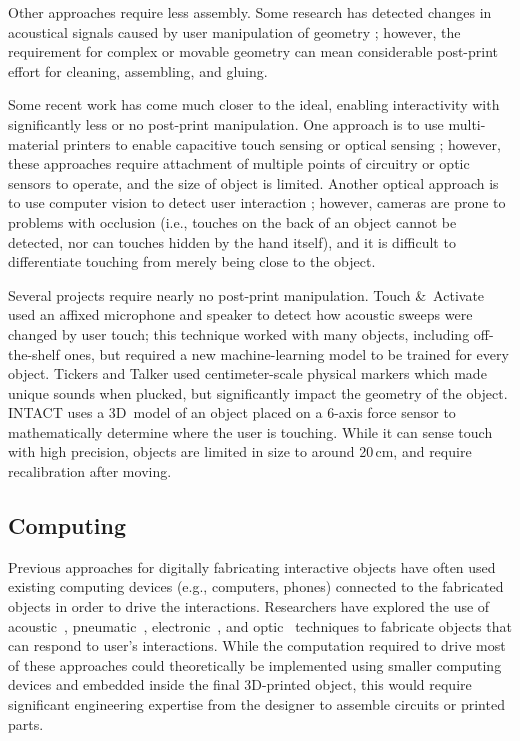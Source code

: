       Other approaches require less assembly. Some research has detected changes
      in acoustical signals caused by user manipulation of geometry
      \cite{Savage:2015, Laput:2015, Li:2016}; however, the requirement for
      complex or movable geometry can mean considerable post-print effort for
      cleaning, assembling, and gluing.

      Some recent work has come much closer to the \pap ideal, enabling
      interactivity with significantly less or no post-print manipulation. One
      approach is to use multi-material printers to enable capacitive touch
      sensing \cite{Schmitz:2015, Schmitz:2019, Gotzelmann:2016} or optical
      sensing \cite{Willis:2012}; however, these approaches require attachment
      of multiple points of circuitry or optic sensors to operate, and the size
      of object is limited. Another optical approach is to use computer vision
      to detect user interaction \cite{Shi:2016a}; however, cameras are prone to
      problems with occlusion (i.e., touches on the back of an object cannot be
      detected, nor can touches hidden by the hand itself), and it is difficult
      to differentiate touching from merely being close to the object.

      Several projects require nearly no post-print manipulation.
      Touch \&~Activate \cite{Ono:2013} used an affixed microphone and speaker
      to detect how acoustic sweeps were changed by user touch; this technique
      worked with many objects, including off-the-shelf ones, but required a new
      machine-learning model to be trained for every object.  Tickers and Talker
      \cite{Shi:2016} used centimeter-scale physical markers which made unique
      sounds when plucked, but significantly impact the geometry of the object.
      INTACT \cite{Hudin:2016} uses a 3D~model of an object placed on a 6-axis
      force sensor to mathematically determine where the user is touching. While
      it can sense touch with high precision, objects are limited in size to
      around 20\,cm, and require recalibration after moving.

    \subsection{Computing} \label{sec:computing}
      Previous approaches for digitally fabricating interactive objects
      have often used existing computing devices (e.g., computers,
      phones) connected to the fabricated objects in order to drive the
      interactions. Researchers have explored the use of
      acoustic~\cite{Savage:2015, Tejada:2018, Shi:2016},
      pneumatic~\cite{Tejada:2020, Vazquez:2015, Ou:2016},
      electronic~\cite{Schmitz:2019, Savage:2014,Schmitz:2015}, and
      optic~\cite{Willis:2012, Savage:2013} techniques to fabricate
      objects that can respond to user's interactions. While the
      computation required to drive most of these approaches could
      theoretically be implemented using smaller computing devices and
      embedded inside the final 3D-printed object, this would require
      significant engineering expertise from the designer to assemble
      circuits or printed parts.

